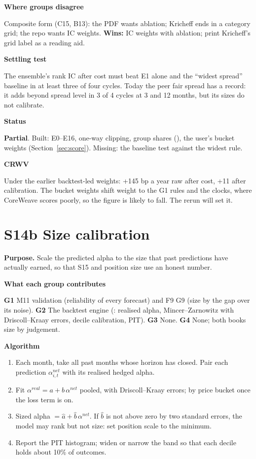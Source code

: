 \documentclass[11pt]{article}
\newcommand{\stpartial}{\textcolor{warn}{\textbf{Partial}}}
\newcommand{\GA}{\textcolor{gA}{\textbf{G1}}}
\newcommand{\GB}{\textcolor{gB}{\textbf{G2}}}
\newcommand{\GC}{\textcolor{gC}{\textbf{G3}}}
\newcommand{\GD}{\textcolor{gD}{\textbf{G4}}}
\newcommand{\fld}[1]{\par\medskip\noindent\textbf{\textcolor{steel}{#1}}\par\nopagebreak}
\begin{document}
\fld{Where groups disagree} Composite form (C15, B13): the PDF wants ablation; Kricheff ends in a category grid; the repo wants IC weights. \textbf{Wins:} IC weights with ablation; print Kricheff's grid label as a reading aid.

\fld{Settling test} The ensemble's rank IC after cost must beat E1 alone and the ``widest spread'' baseline in at least three of four cycles. Today the peer fair spread has a record: it adds beyond spread level in 3 of 4 cycles at 3 and 12 months, but its sizes do not calibrate.

\fld{Status} \stpartial. Built: E0--E16, one-way clipping, group shares (), the user's bucket weights (Section~\ref{sec:score}). Missing: the baseline test against the widest rule.

\fld{CRWV} Under the earlier backtest-led weights: +145 bp a year raw after cost, +11 after calibration. The bucket weights shift weight to the G1 rules and the clocks, where CoreWeave scores poorly, so the figure is likely to fall. The rerun will set it.

\section{S14b Size calibration}\label{s14b}

\textbf{Purpose.} Scale the predicted alpha to the size that past predictions have actually earned, so that S15 and position size use an honest number.

\fld{What each group contributes} \GA{} M11 validation (reliability of every forecast) and F9 G9 (size by the gap over its noise). \GB{} The backtest engine (: realised alpha, Mincer--Zarnowitz with Driscoll--Kraay errors, decile calibration, PIT). \GC{} None. \GD{} None; both books size by judgement.

\fld{Algorithm}
\begin{algobox}
\begin{enumerate}
\item Each month, take all past months whose horizon has closed. Pair each prediction $\alpha^{net}_{i,t}$ with its realised hedged alpha.
\item Fit $\alpha^{real} = a + b\,\alpha^{net}$ pooled, with Driscoll--Kraay errors; by price bucket once the loss term is on.
\item Sized alpha $= \hat a + \hat b\,\alpha^{net}$. If $\hat b$ is not above zero by two standard errors, the model may rank but not size: set position scale to the minimum.
\item Report the PIT histogram; widen or narrow the band so that each decile holds about 10\% of outcomes.
\end{enumerate}
\end{algobox}
\end{document}
